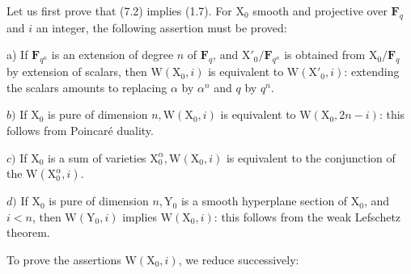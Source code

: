 \documentclass[10pt,leqno]{article}
\begin{document}
\clearpage

\endgroup

\label{physical-30}\par\smallskip

\noindent Let us first prove that (7.2) implies (1.7). For \(\mathrm{X}_{0}\) smooth and projective over \(\mathbf{F}_{q}\) and \(i\) an integer, the following assertion must be proved:\par

\par

\noindent a) If \(\mathbf{F}_{q^{n}}\) is an extension of degree \(n\) of \(\mathbf{F}_{q}\), and \(\mathrm{X}'_{0}/\mathbf{F}_{q^{n}}\) is obtained from \(\mathrm{X}_{0}/\mathbf{F}_{q}\) by extension of scalars, then \(\mathrm{W}(\mathrm{X}_{0},i)\) is equivalent to \(\mathrm{W}(\mathrm{X}'_{0},i)\): extending the scalars amounts to replacing \(\alpha \) by \(\alpha ^{n}\) and \(q\) by \(q^{n}\).\par

\noindent \(b)\) If \(\mathrm{X}_{0}\) is pure of dimension \(n, \mathrm{W}(\mathrm{X}_{0},i)\) is equivalent to \(\mathrm{W}(\mathrm{X}_{0},2n- i)\): this follows from Poincaré duality.\par

\noindent \(c)\) If \(\mathrm{X}_{0}\) is a sum of varieties \(\mathrm{X}_{0}^{\alpha }, \mathrm{W}(\mathrm{X}_{0},i)\) is equivalent to the conjunction of the \(\mathrm{W}(\mathrm{X}_{0}^{\alpha },i)\).\par

\noindent \(d)\) If \(\mathrm{X}_{0}\) is pure of dimension \(n, \mathrm{Y}_{0}\) is a smooth hyperplane section of \(\mathrm{X}_{0}\), and \(i<n\), then \(\mathrm{W}(\mathrm{Y}_{0},i)\) implies \(\mathrm{W}(\mathrm{X}_{0},i)\): this follows from the weak Lefschetz theorem.\par

\noindent To prove the assertions \(\mathrm{W}(\mathrm{X}_{0},i)\), we reduce successively:\par
\end{document}

